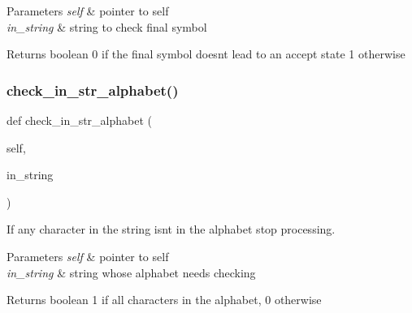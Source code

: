 \begin{DoxyParams}{Parameters}
{\em self} & pointer to self \\
\hline
{\em in\+\_\+string} & string to check final symbol \\
\hline
\end{DoxyParams}
\begin{DoxyReturn}{Returns}
boolean 0 if the final symbol doesn\textquotesingle{}t lead to an accept state 1 otherwise 
\end{DoxyReturn}
\mbox{\label{classfinite__automaton_1_1_f_a_ae2909d69bb02d15bdf17c808106e35d7}} 
\subsubsection{\texorpdfstring{check\+\_\+in\+\_\+str\+\_\+alphabet()}{check\_in\_str\_alphabet()}}
{\footnotesize\ttfamily def check\+\_\+in\+\_\+str\+\_\+alphabet (\begin{DoxyParamCaption}\item[{}]{self,  }\item[{}]{in\+\_\+string }\end{DoxyParamCaption})}



If any character in the string isn\textquotesingle{}t in the alphabet stop processing. 


\begin{DoxyParams}{Parameters}
{\em self} & pointer to self \\
\hline
{\em in\+\_\+string} & string whose alphabet needs checking \\
\hline
\end{DoxyParams}
\begin{DoxyReturn}{Returns}
boolean 1 if all characters in the alphabet, 0 otherwise 
\end{DoxyReturn}
\mbox{\label{classfinite__automaton_1_1_f_a_a5807041a61c4627c67836cd425522675}} 
